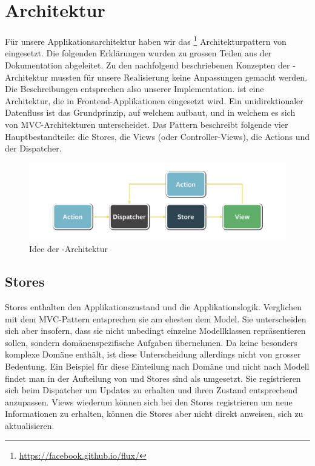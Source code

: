 \label{pd-architektur}
\section{Architektur}
Für unsere Applikationsarchitektur haben wir das \footnote{\url{https://facebook.github.io/flux/}} Architekturpattern von  eingesetzt.\newline
Die folgenden Erklärungen wurden zu grossen Teilen aus der  Dokumentation\cite{flux-docs-overview} abgeleitet.
Zu den nachfolgend beschriebenen Konzepten der -Architektur mussten für unsere Realisierung keine Anpassungen gemacht werden.
Die Beschreibungen entsprechen also unserer Implementation.\newline
{} ist eine Architektur, die in \gls{Frontend}-Applikationen eingesetzt wird.
Ein unidirektionaler Datenfluss ist das Grundprinzip, auf welchem  aufbaut, und in welchem es sich von \gls{MVC}-Architekturen unterscheidet.
Das Pattern beschreibt folgende vier Hauptbestandteile: die Stores, die Views (oder Controller-Views), die Actions und der Dispatcher.
\begin{figure}[H]
 	\centering
 	\includegraphics[width=\textwidth]{images/projektdokumentation/flux-uebersicht-weiss.png}
 	\caption{Idee der -Architektur}
 	\label{image-flux-overview-simple}
\end{figure}
\subsection{Stores}
\label{pd-flux-stores}
Stores enthalten den Applikationszustand und die Applikationslogik.
Verglichen mit dem \gls{MVC}-Pattern entsprechen sie am ehesten dem Model.
Sie unterscheiden sich aber insofern, dass sie nicht unbedingt einzelne Modellklassen repräsentieren sollen, sondern domänenspezifische Aufgaben übernehmen.
Da \kort{} keine besonders komplexe Domäne enthält, ist diese Unterscheidung allerdings nicht von grosser Bedeutung.
Ein Beispiel für diese Einteilung nach Domäne und nicht nach Modell findet man in der Aufteilung von  und \newline
Stores sind als  umgesetzt.
Sie registrieren sich beim Dispatcher um Updates zu erhalten und ihren Zustand entsprechend anzupassen.
Views wiederum können sich bei den Stores registrieren um neue Informationen zu erhalten, können die Stores aber nicht direkt anweisen, sich zu aktualisieren.

